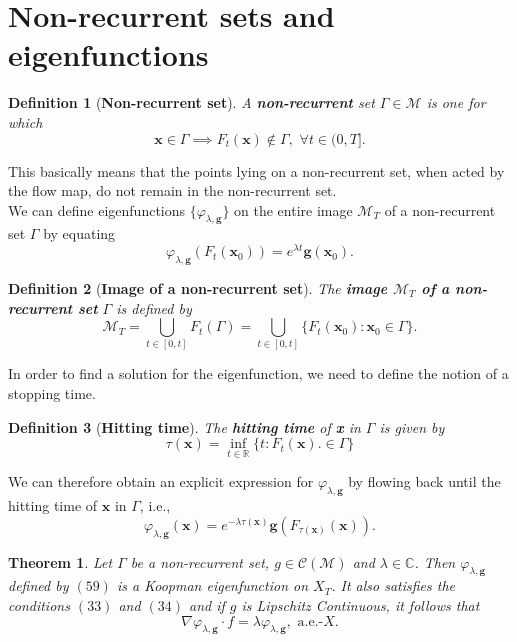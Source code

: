 \documentclass[]{article}
\newtheorem{definition}{Definition}
\newtheorem{theorem}{Theorem}
\begin{document}
\section{Non-recurrent sets and eigenfunctions}
\begin{definition}[\textbf{Non-recurrent set}]
A \textbf{non-recurrent} set $\Gamma \in \mathcal{M}$ is one for which
\begin{equation}
	\textbf{x} \in \Gamma \implies F_t(\textbf{x}) \notin \Gamma, \,\, \forall t \in (0,T].
\end{equation}
\end{definition}
This basically means that the points lying on a non-recurrent set, when acted by the flow map, do not remain in the non-recurrent set. \\
We can define eigenfunctions $\{\varphi_{\lambda, \textbf{g}}\}$ on the entire image $\mathcal{M}_T$ of a non-recurrent set $\Gamma$ by equating
\begin{equation}
	\varphi_{\lambda, \textbf{g}} (F_t(\textbf{x}_0)) = e^{\lambda t}\textbf{g}(\textbf{x}_0).
\end{equation}
\begin{definition}[\textbf{Image of a non-recurrent set}]
The \textbf{image $\mathcal{M}_T$ of a non-recurrent set} $\Gamma$ is defined by
\begin{equation}
	\mathcal{M}_T = \bigcup_{t \in [0,t]} F_t(\Gamma) = \bigcup_{t \in [0,t]} \{F_t(\textbf{x}_0): \textbf{x}_0 \in \Gamma\}.
\end{equation}
\end{definition}
In order to find a solution for the eigenfunction, we need to define the notion of a stopping time.
\begin{definition}[\textbf{Hitting time}]
The \textbf{hitting time} of \textbf{x} in $\Gamma$ is given by
\begin{equation}
	\tau(\textbf{x}) = \inf_{t \in \mathbb{R}} \{t:F_t(\textbf{x}). \in \Gamma\}
\end{equation}
\end{definition}
We can therefore obtain an explicit expression for $\varphi_{\lambda, \textbf{g}}$ by flowing back until the hitting time of $\textbf{x}$ in $\Gamma$, i.e.,
\begin{equation}
	\varphi_{\lambda, \textbf{g}}(\textbf{x}) = e^{-\lambda \tau(\textbf{x})} \textbf{g}(F_{\tau(\textbf{x})}(\textbf{x})).
\end{equation}
\begin{theorem}
Let $\Gamma$ be a non-recurrent set, $g \in \mathcal{C}(\mathcal{M})$ and $\lambda \in \mathbb{C}$. Then $\varphi_{\lambda, \textbf{g}}$ defined by $(59)$ is a Koopman eigenfunction on $X_T$. It also satisfies the conditions $(33)$ and $(34)$ and if $g$ is Lipschitz Continuous, it follows that 
\begin{equation}
	\nabla \varphi_{\lambda, \textbf{g}} \cdot f = \lambda \varphi_{\lambda, \textbf{g}}, \,\, \text{a.e.-$X$}.
\end{equation}
\end{theorem}
\end{document}
